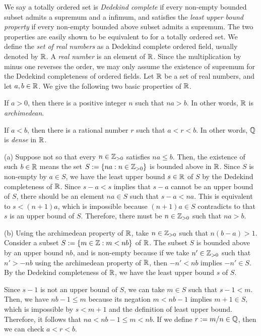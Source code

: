 \documentclass{../../large}
\begin{document}
\begin{prb}
We say a totally ordered set is \emph{Dedekind complete} if every non-empty bounded subset admits a supremum and a infimum, and satisfies the \emph{least upper bound property} if every non-empty bounded above subset admits a supremum.
The two properties are easily shown to be equivalent to for a totally ordered set.
We define the \emph{set of real numbers} as a Dedekind complete ordered field, usually denoted by $\mathbb{R}$.
A \emph{real number} is an element of $\mathbb{R}$.
Since the multiplication by minus one reverses the order, we may only assume the existence of supremum for the Dedekind completeness of ordered fields.
Let $\mathbb{R}$ be a set of real numbers, and let $a,b\in\mathbb{R}$.
We give the following two basic properties of $\mathbb{R}$.
\begin{parts}
\item If $a>0$, then there is a positive integer $n$ such that $na>b$. In other words, $\mathbb{R}$ is \emph{archimedean}.
\item If $a<b$, then there is a rational number $r$ such that $a<r<b$. In other words, $\mathbb{Q}$ is \emph{dense} in $\mathbb{R}$.
\end{parts}
\end{prb}
\begin{pf}
(a)
Suppose not so that every $n\in\mathbb{Z}_{>0}$ satisfies $na\le b$.
Then, the existence of such $b\in\mathbb{R}$ means the set $S:=\{na:n\in\mathbb{Z}_{>0}\}$ is bounded above in $\mathbb{R}$.
Since $S$ is non-empty by $a\in S$, we have the least upper bound $s\in\mathbb{R}$ of $S$ by the Dedekind completeness of $\mathbb{R}$.
Since $s-a<s$ implies that $s-a$ cannot be an upper bound of $S$, there should be an element $na\in S$ such that $s-a<na$.
This is equivalent to $s<(n+1)a$, which is impossible because $(n+1)a\in S$ contradicts to that $s$ is an upper bound of $S$.
Therefore, there must be $n\in\mathbb{Z}_{>0}$ such that $na>b$.

(b)
Using the archimedean property of $\mathbb{R}$, take $n\in\mathbb{Z}_{>0}$ such that $n(b-a)>1$.
Consider a subset $S:=\{m\in\mathbb{Z}:m<nb\}$ of $\mathbb{R}$.
The subset $S$ is bounded above by an upper bound $nb$, and is non-empty because if we take $n'\in\mathbb{Z}_{>0}$ such that $n'>-nb$ using the archimedean property of $\mathbb{R}$, then $-n'<nb$ implies $-n'\in S$.
By the Dedekind completeness of $\mathbb{R}$, we have the least upper bound $s$ of $S$.

Since $s-1$ is not an upper bound of $S$, we can take $m\in S$ such that $s-1<m$.
Then, we have $nb-1\le m$ because its negation $m<nb-1$ implies $m+1\in S$, which is impossible by $s<m+1$ and the definition of least upper bound.
Therefore, it follows that $na<nb-1\le m<nb$.
If we define $r:=m/n\in\mathbb{Q}$, then we can check $a<r<b$.
\end{pf}
\end{document}
